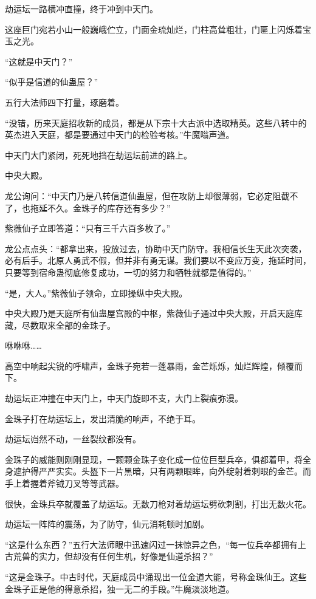 \begin{this_body}
劫运坛一路横冲直撞，终于冲到中天门。

这座巨门宛若小山一般巍峨伫立，门面金琉灿烂，门柱高耸粗壮，门匾上闪烁着宝玉之光。

“这就是中天门？”

“似乎是信道的仙蛊屋？”

五行大法师四下打量，琢磨着。

“没错，历来天庭招收新的成员，都是从下宗十大古派中选取精英。这些八转中的英杰进入天庭，都是要通过中天门的检验考核。”牛魔嗡声道。

中天门大门紧闭，死死地挡在劫运坛前进的路上。

中央大殿。

龙公询问：“中天门乃是八转信道仙蛊屋，但在攻防上却很薄弱，它必定阻截不了，也拖延不久。金珠子的库存还有多少？”

紫薇仙子立即答道：“只有三千六百多枚了。”

龙公点点头：“都拿出来，投放过去，协助中天门防守。我相信长生天此次突袭，必有后手。北原人勇武不假，但并非有勇无谋。我们要以不变应万变，拖延时间，只要等到宿命蛊彻底修复成功，一切的努力和牺牲就都是值得的。”

“是，大人。”紫薇仙子领命，立即操纵中央大殿。

中央大殿乃是天庭所有仙蛊屋宫殿的中枢，紫薇仙子通过中央大殿，开启天庭库藏，尽数取来全部的金珠子。

咻咻咻……

高空中响起尖锐的呼啸声，金珠子宛若一蓬暴雨，金芒烁烁，灿烂辉煌，倾覆而下。

劫运坛正冲撞在中天门上，中天门旋即不支，大门上裂痕弥漫。

金珠子打在劫运坛上，发出清脆的响声，不绝于耳。

劫运坛岿然不动，一丝裂纹都没有。

金珠子的威能则刚刚显现，一颗颗金珠子变化成一位位巨型兵卒，俱都着甲，将全身遮护得严严实实。头盔下一片黑暗，只有两颗眼眸，向外绽射着刺眼的金芒。而手上着握着斧钺刀叉等等武器。

很快，金珠兵卒就覆盖了劫运坛。无数刀枪对着劫运坛劈砍刺割，打出无数火花。

劫运坛一阵阵的震荡，为了防守，仙元消耗顿时加剧。

“这是什么东西？”五行大法师眼中迅速闪过一抹惊异之色，“每一位兵卒都拥有上古荒兽的实力，但却没有任何生机，好像是仙道杀招？”

“这是金珠子。中古时代，天庭成员中涌现出一位金道大能，号称金珠仙王。这些金珠子正是他的得意杀招，独一无二的手段。”牛魔淡淡地道。


\end{this_body}
